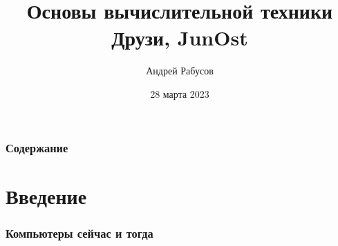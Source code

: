 \documentclass[t,aspectratio=169]{beamer}
\author{Андрей Рабусов}
\date{28 марта 2023}
\title[Программирование]{Основы вычислительной техники\\
Друзи, JunOst}
\begin{document}
\begin{frame}
    \maketitle
\end{frame}

\begin{frame}
    \frametitle{Содержание}
    \tableofcontents[sectionstyle=show,subsectionstyle=show]
\end{frame}

\section*{Введение}
\begin{frame}
    \frametitle{Компьютеры сейчас и тогда}
    \begin{figure}
        \begin{centering}
\end{centering}
\end{figure}
\end{frame}
\end{document}
